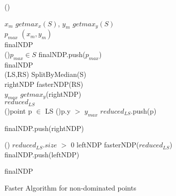 \documentclass{article}
\begin{document}
\begin{algorithm}
\Fn(){}
{
    $x_{m}$ \gets $getmax_x(S)$, $y_m$ \gets $getmax_y(S)$ 
    \\
    $p_{max}$ \gets $(x_m, y_m)$
    \\
    finalNDP \gets \emptyset
    \\
    \If(){$p_{max} \in S$}
    {
        finalNDP.push($p_{max}$)\\
        \Return finalNDP
    }
    \\
    
    (LS,RS) \gets SplitByMedian(S)
    \\
    rightNDP \gets fasterNDP(RS)\\
    $y_{max}$ \gets $getmax_y$(rightNDP)\\
    $reduced_{LS}$ \gets \emptyset
    \\
    
    \For(){point p $\in$ LS}
    {
        \If(){p.y $>$ $y_{max}$}
        {
            $reduced_{LS}$.push(p)
        }
    }
    
    finalNDP.push(rightNDP)
    
    \If() {$reduced_{LS}.size$ $>$ 0} {
        leftNDP \gets fasterNDP($reduced_{LS}$)\\
        finalNDP.push(leftNDP)
    }
    
    \Return finalNDP


}
\caption{Faster Algorithm for non-dominated points}
\end{algorithm}

    
    
\end{document}

